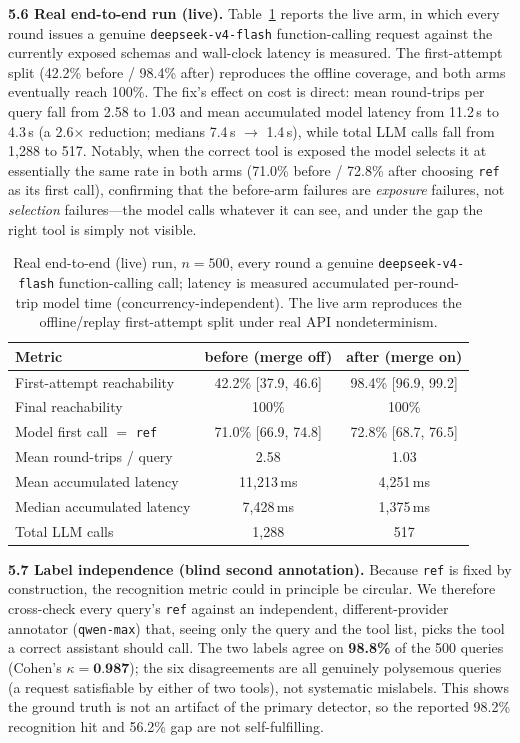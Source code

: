 \textbf{5.6 Real end-to-end run (live).} Table~\ref{tab:live} reports the live arm, in which every round issues a genuine \texttt{deepseek-v4-flash} function-calling request against the currently exposed schemas and wall-clock latency is measured. The first-attempt split (42.2\% before / 98.4\% after) reproduces the offline coverage, and both arms eventually reach 100\%. The fix's effect on cost is direct: mean round-trips per query fall from 2.58 to 1.03 and mean accumulated model latency from 11.2\,s to 4.3\,s (a 2.6$\times$ reduction; medians 7.4\,s $\rightarrow$ 1.4\,s), while total LLM calls fall from 1,288 to 517. Notably, when the correct tool is exposed the model selects it at essentially the same rate in both arms (71.0\% before / 72.8\% after choosing \texttt{ref} as its first call), confirming that the before-arm failures are \emph{exposure} failures, not \emph{selection} failures---the model calls whatever it can see, and under the gap the right tool is simply not visible.

\begin{table}[t]
\caption{Real end-to-end (live) run, $n=500$, every round a genuine \texttt{deepseek-v4-flash} function-calling call; latency is measured accumulated per-round-trip model time (concurrency-independent). The live arm reproduces the offline/replay first-attempt split under real API nondeterminism.}
\label{tab:live}
\begin{center}
\footnotesize
\begin{tabular}{lcc}
\toprule
\textbf{Metric} & \textbf{before (merge off)} & \textbf{after (merge on)} \\
\midrule
First-attempt reachability & 42.2\% [37.9, 46.6] & 98.4\% [96.9, 99.2] \\
Final reachability & 100\% & 100\% \\
Model first call $=$ \texttt{ref} & 71.0\% [66.9, 74.8] & 72.8\% [68.7, 76.5] \\
Mean round-trips / query & 2.58 & 1.03 \\
Mean accumulated latency & 11,213\,ms & 4,251\,ms \\
Median accumulated latency & 7,428\,ms & 1,375\,ms \\
Total LLM calls & 1,288 & 517 \\
\bottomrule
\end{tabular}
\end{center}
\end{table}

\textbf{5.7 Label independence (blind second annotation).} Because \texttt{ref} is fixed by construction, the recognition metric could in principle be circular. We therefore cross-check every query's \texttt{ref} against an independent, different-provider annotator (\texttt{qwen-max}) that, seeing only the query and the tool list, picks the tool a correct assistant should call. The two labels agree on \textbf{98.8\%} of the 500 queries (Cohen's $\kappa=\textbf{0.987}$); the six disagreements are all genuinely polysemous queries (a request satisfiable by either of two tools), not systematic mislabels. This shows the ground truth is not an artifact of the primary detector, so the reported 98.2\% recognition hit and 56.2\% gap are not self-fulfilling.

